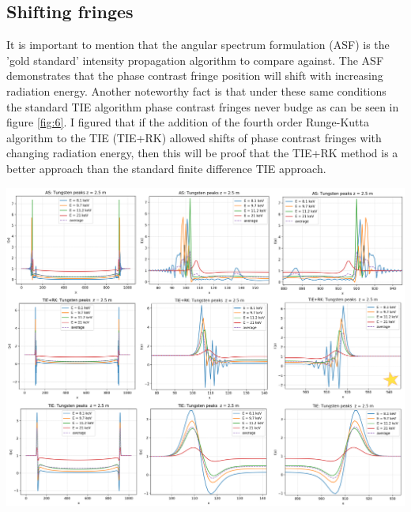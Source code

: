 \documentclass[10pt, a4paper, singlespacing]{report}
\newenvironment{Figure}
    {\par\medskip\noindent\minipage{\linewidth}}
    {\endminipage\par\medskip}
\begin{document}
\subsection{Shifting fringes}
It is important to mention that the angular spectrum formulation (ASF) is the 'gold standard' intensity propagation algorithm to compare against. The ASF demonstrates that the phase contrast fringe position will shift with increasing radiation energy. Another noteworthy fact is that under these same conditions the standard TIE algorithm phase contrast fringes never budge as can be seen in figure \ref{fig:6}. I figured that if the addition of the fourth order Runge-Kutta algorithm to the TIE (TIE+RK) allowed shifts of phase contrast fringes with changing radiation energy, then this will be proof that the TIE+RK method is a better approach than the standard finite difference TIE approach.
\begin{Figure}\label{fig:6}  
 \centering
  \hspace*{-0.9cm}
 \includegraphics[width=1.1\linewidth]{AS_vs_TIE+RK_vs_TIE_1.pdf}
\end{Figure}
\end{document}
